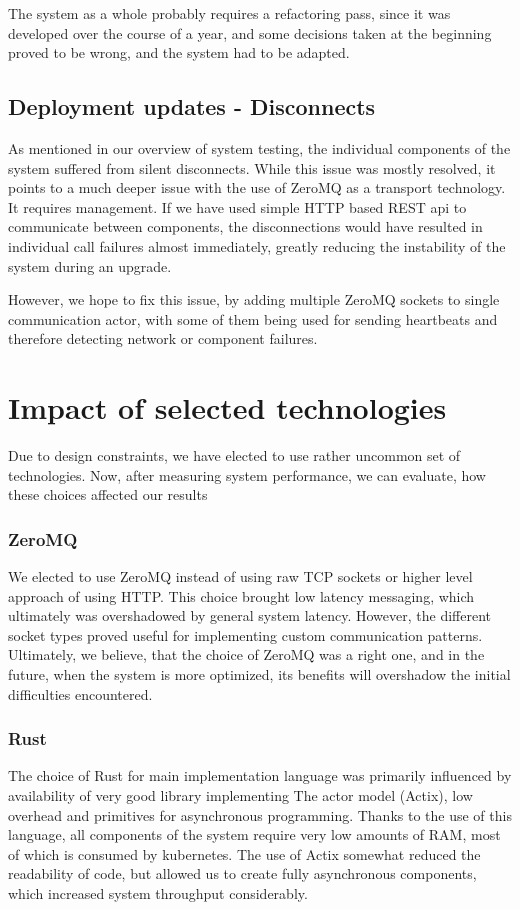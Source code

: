 The system as a whole probably requires a refactoring pass, since it was developed over the course of a year,
and some decisions taken at the beginning proved to be wrong, and the system had to be adapted.

\subsection{Deployment updates - Disconnects}
As mentioned in our overview of system testing, the individual components of the system suffered from silent disconnects.
While this issue was mostly resolved, it points to a much deeper issue with the use of ZeroMQ as a transport technology.
It requires management. If we have used simple HTTP based REST api to communicate between components, the disconnections
would have resulted in individual call failures almost immediately, greatly reducing the instability of the system during
an upgrade.

However, we hope to fix this issue, by adding multiple ZeroMQ sockets to single communication actor, with some
of them being used for sending heartbeats and therefore detecting network or component failures.

\section{Impact of selected technologies}
Due to design constraints, we have elected to use rather uncommon set of technologies. Now, after measuring system
performance, we can evaluate, how these choices affected our results

\subsubsection{ZeroMQ}
We elected to use ZeroMQ instead of using raw TCP sockets or higher level approach of using HTTP.
This choice brought low latency messaging, which ultimately was overshadowed by general system latency. However, the
different socket types proved useful for implementing custom communication patterns. Ultimately, we
believe, that the choice of ZeroMQ was a right one, and in the future, when the system is more optimized, its benefits
will overshadow the initial difficulties encountered.

\subsubsection{Rust}
The choice of Rust for main implementation language was primarily influenced by availability of very good library
implementing The actor model (Actix), low overhead and primitives for asynchronous programming. Thanks to the
use of this language, all components of the system require very low amounts of RAM, most of which
is consumed by kubernetes. The use of Actix somewhat reduced the readability of code, but allowed us to create
fully asynchronous components, which increased system throughput considerably.

